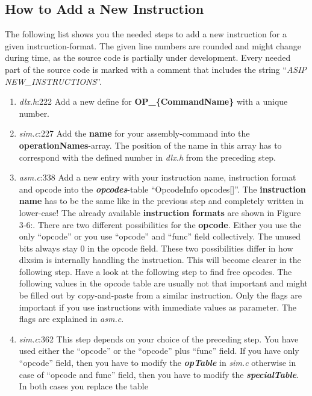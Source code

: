 \hypertarget{how-to-add-a-new-instruction}{%
\subsection{How to Add a New
Instruction}\label{how-to-add-a-new-instruction}}
The following list shows you the needed steps to add a new instruction
for a given instruction-format. The given line numbers are rounded and
might change during time, as the source code is partially under
development. Every needed part of the source code is marked with a
comment that includes the string ``\emph{ASIP NEW\_INSTRUCTIONS}''.
\begin{enumerate}
\item
  \emph{dlx.h}:222 Add a new define for \textbf{OP\_\{CommandName\}}
  with a unique number.
\item
  \emph{sim.c}:227 Add the \textbf{name} for your assembly-command into
  the \textbf{operationNames}-array. The position of the name in this
  array has to correspond with the defined number in \emph{dlx.h} from
  the preceding step.
\item
  \emph{asm.c}:338 Add a new entry with your instruction name,
  instruction format and opcode into the \emph{\textbf{opcodes}}-table
  ``OpcodeInfo opcodes{[}{]}''. The \textbf{instruction name} has to be
  the same like in the previous step and completely written in
  lower-case! The already available \textbf{instruction formats} are
  shown in Figure 3‑6:. There are two different possibilities for the
  \textbf{opcode}. Either you use the only ``opcode'' or you use
  ``opcode'' and ``func'' field collectively. The unused bits always
  stay 0 in the opcode field. These two possibilities differ in how
  dlxsim is internally handling the instruction. This will become
  clearer in the following step. Have a look at the following step to
  find free opcodes. The following values in the opcode table are
  usually not that important and might be filled out by copy-and-paste
  from a similar instruction. Only the flags are important if you use
  instructions with immediate values as parameter. The flags are
  explained in \emph{asm.c}.
\item
  \emph{sim.c}:362 This step depends on your choice of the preceding
  step. You have used either the ``opcode'' or the ``opcode'' plus
  ``func'' field. If you have only ``opcode'' field, then you have to
  modify the \emph{\textbf{opTable}} in \emph{sim.c} otherwise in case
  of ``opcode and func'' field, then you have to modify the
  \emph{\textbf{specialTable}}. In both cases you replace the table

\end{enumerate}
